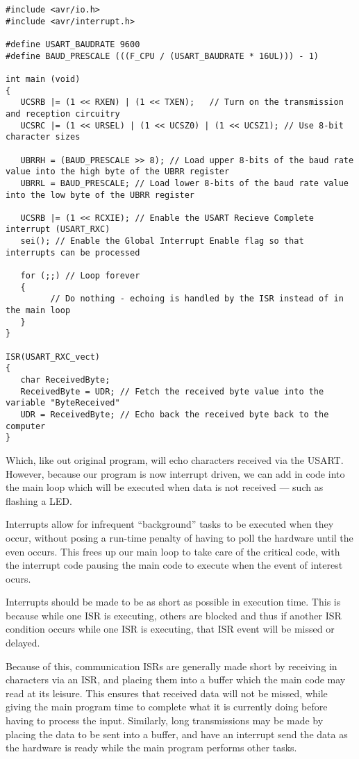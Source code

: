 \documentclass[a4paper,oneside]{book}
\begin{document}
\begin{center}
\begin{lstlisting}
#include <avr/io.h>
#include <avr/interrupt.h>

#define USART_BAUDRATE 9600
#define BAUD_PRESCALE (((F_CPU / (USART_BAUDRATE * 16UL))) - 1)

int main (void)
{
   UCSRB |= (1 << RXEN) | (1 << TXEN);   // Turn on the transmission and reception circuitry
   UCSRC |= (1 << URSEL) | (1 << UCSZ0) | (1 << UCSZ1); // Use 8-bit character sizes

   UBRRH = (BAUD_PRESCALE >> 8); // Load upper 8-bits of the baud rate value into the high byte of the UBRR register
   UBRRL = BAUD_PRESCALE; // Load lower 8-bits of the baud rate value into the low byte of the UBRR register

   UCSRB |= (1 << RCXIE); // Enable the USART Recieve Complete interrupt (USART_RXC)
   sei(); // Enable the Global Interrupt Enable flag so that interrupts can be processed

   for (;;) // Loop forever
   {
         // Do nothing - echoing is handled by the ISR instead of in the main loop
   }   
}

ISR(USART_RXC_vect)
{
   char ReceivedByte;
   ReceivedByte = UDR; // Fetch the received byte value into the variable "ByteReceived"
   UDR = ReceivedByte; // Echo back the received byte back to the computer
}
\end{lstlisting}
\end{center}

Which, like out original program, will echo characters received via the USART. However, because our program is now interrupt driven, we can add in code into the main loop which will be executed when data is not received --- such as flashing a LED.

Interrupts allow for infrequent ``background'' tasks to be executed when they occur, without posing a run-time penalty of having to poll the hardware until the even occurs. This frees up our main loop to take care of the critical code, with the interrupt code pausing the main code to execute when the event of interest ocurs.

Interrupts should be made to be as short as possible in execution time. This is because while one ISR is executing, others are blocked and thus if another ISR condition occurs while one ISR is executing, that ISR event will be missed or delayed.

Because of this, communication ISRs are generally made short by receiving in characters via an ISR, and placing them into a buffer which the main code may read at its leisure. This ensures that received data will not be missed, while giving the main program time to complete what it is currently doing before having to process the input. Similarly, long transmissions may be made by placing the data to be sent into a buffer, and have an interrupt send the data as the hardware is ready while the main program performs other tasks. 
\end{document}
